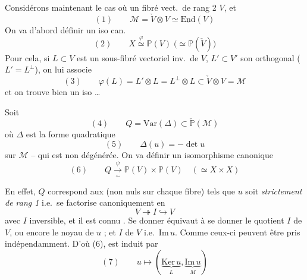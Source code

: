 \documentclass[11pt,a4paper]{article}
\begin{document}
Considérons maintenant le cas où \ill{}
un fibré vect.\ de rang 2 $V$, et \struck{\ill{}}
\[
  (1) \qquad \mathcal{M} = \check{V} \otimes V \simeq \underline{\mathrm{End}}(V)
\]
On va d'abord définir un iso can.
\[
  (2) \qquad X \overset{\varphi}{\simeq} \mathbb{P}(V) \;\bigl(\simeq \mathbb{P}(\check{V})\bigr)
\]
Pour cela, si $L \subset V$ \struck{\ill{}} est un sous-fibré vectoriel inv.\ de $V$,
\struck{\ill{}} $L' \subset V'$ son orthogonal ($L' = L^{\perp}$), on lui associe
\[
  (3) \qquad \varphi(L) = L' \otimes L = L^{\perp} \otimes L \subset \check{V} \otimes V = \mathcal{M}
\]
et on trouve bien un iso \ldots

Soit
\[
  (4) \qquad Q = \mathrm{Var}(\Delta) \subset \check{\mathbb{P}}(\mathcal{M})
\]
où $\Delta$ est la forme quadratique
\[
  (5) \qquad \Delta(u) = -\det u
\]
sur $\mathcal{M}$ -- qui est non dégénérée. On va définir un isomorphisme canonique
\[
  (6) \qquad Q \xrightarrow[\sim]{\ \psi\ } \mathbb{P}(V) \times \mathbb{P}(V) \quad (\simeq X \times X)
\]

En effet, $Q$ correspond aux 
 (non nuls sur chaque fibre) tels que $u$ soit
\emph{strictement de rang 1} i.e.\ se factorise canoniquement en
\[
  V \twoheadrightarrow I \hookrightarrow V
\]
avec $I$ inversible, et il est connu \ill{} .
Se donner  \ill{} équivaut à se donner le quotient $I$ de $V$,
\struck{\ill{}} ou encore le noyau de $u$ ; et  \ill{} $I$ de $V$
i.e.\ $\mathrm{Im}\, u$. Comme ceux-ci peuvent être pris indépendamment. D'où (6),
 est induit par
\[
  (7) \qquad u \longmapsto (\underbrace{\mathrm{Ker}\, u}_{L}, \underbrace{\mathrm{Im}\, u}_{M})
\]
\end{document}
